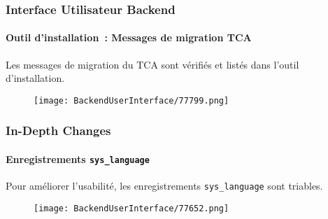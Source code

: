 
\begin{frame}[fragile]
	\frametitle{Interface Utilisateur Backend}
	\framesubtitle{Outil d'installation~: Messages de migration TCA}

	Les messages de migration du TCA sont vérifiés et listés dans l'outil d'installation.

	\begin{figure}
		\texttt{[image: BackendUserInterface/77799.png]}
	\end{figure}

\end{frame}


\begin{frame}[fragile]
	\frametitle{In-Depth Changes}
	\framesubtitle{Enregistrements \texttt{sys\_language}}

	Pour améliorer l'usabilité, les enregistrements \texttt{sys\_language} sont triables.

	\begin{figure}
		\texttt{[image: BackendUserInterface/77652.png]}
	\end{figure}

\end{frame}


